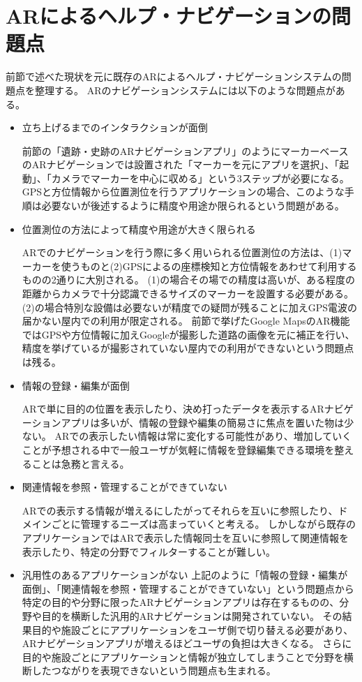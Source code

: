 \section{ARによるヘルプ・ナビゲーションの問題点}
\label{problems}
前節で述べた現状を元に既存のARによるヘルプ・ナビゲーションシステムの問題点を整理する。
ARのナビゲーションシステムには以下のような問題点がある。

\begin{itemize}
  \item 立ち上げるまでのインタラクションが面倒
  
  前節の「遺跡・史跡のARナビゲーションアプリ」のようにマーカーベースのARナビゲーションでは設置された「マーカーを元にアプリを選択」、「起動」、「カメラでマーカーを中心に収める」という3ステップが必要になる。
  GPSと方位情報から位置測位を行うアプリケーションの場合、このような手順は必要ないが後述するように精度や用途か限られるという問題がある。
  
  \item 位置測位の方法によって精度や用途が大きく限られる
  
  ARでのナビゲーションを行う際に多く用いられる位置測位の方法は、(1)マーカーを使うものと(2)GPSによるの座標検知と方位情報をあわせて利用するものの2通りに大別される。
  (1)の場合その場での精度は高いが、ある程度の距離からカメラで十分認識できるサイズのマーカーを設置する必要がある。
  (2)の場合特別な設備は必要ないが精度での疑問が残ることに加えGPS電波の届かない屋内での利用が限定される。
  前節で挙げたGoogle MapsのAR機能ではGPSや方位情報に加えGoogleが撮影した道路の画像を元に補正を行い、精度を挙げているが撮影されていない屋内での利用ができないという問題点は残る。

  \item 情報の登録・編集が面倒
  
  ARで単に目的の位置を表示したり、決め打ったデータを表示するARナビゲーションアプリは多いが、情報の登録や編集の簡易さに焦点を置いた物は少ない。
  ARでの表示したい情報は常に変化する可能性があり、増加していくことが予想される中で一般ユーザが気軽に情報を登録編集できる環境を整えることは急務と言える。

  \item 関連情報を参照・管理することができていない
  
  ARでの表示する情報が増えるにしたがってそれらを互いに参照したり、ドメインごとに管理するニーズは高まっていくと考える。
  しかしながら既存のアプリケーションではARで表示した情報同士を互いに参照して関連情報を表示したり、特定の分野でフィルターすることが難しい。

  \item 汎用性のあるアプリケーションがない
  上記のように「情報の登録・編集が面倒」、「関連情報を参照・管理することができていない」という問題点から特定の目的や分野に限ったARナビゲーションアプリは存在するものの、分野や目的を横断した汎用的ARナビゲーションは開発されていない。
  その結果目的や施設ごとにアプリケーションをユーザ側で切り替える必要があり、ARナビゲーションアプリが増えるほどユーザの負担は大きくなる。
  さらに目的や施設ごとにアプリケーションと情報が独立してしまうことで分野を横断したつながりを表現できないという問題点も生まれる。

\end{itemize}


